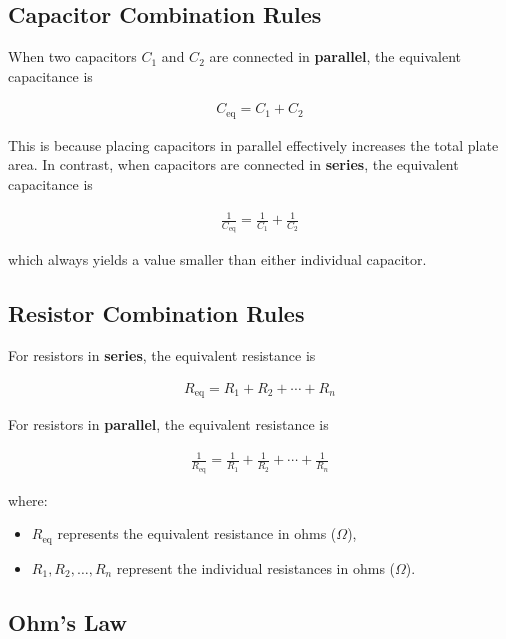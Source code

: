 \message{ !name(lab_report.tex)}\documentclass[12pt]{article}
\begin{document}
\subsection{Capacitor Combination Rules}

When two capacitors $C_1$ and $C_2$ are connected in \textbf{parallel}, the equivalent capacitance is

\begin{align*}
    C_{\text{eq}} = C_1 + C_2
\end{align*}

This is because placing capacitors in parallel effectively increases the total plate area. In contrast, when capacitors are connected in \textbf{series}, the equivalent capacitance is

\begin{align*}
    \frac{1}{C_{\text{eq}}} = \frac{1}{C_1} + \frac{1}{C_2}
\end{align*}

which always yields a value smaller than either individual capacitor.

\subsection{Resistor Combination Rules}

For resistors in \textbf{series}, the equivalent resistance is

\begin{align*}
    R_{\text{eq}} = R_1 + R_2 + \cdots + R_n
\end{align*}

For resistors in \textbf{parallel}, the equivalent resistance is

\begin{align*}
    \frac{1}{R_{\text{eq}}} = \frac{1}{R_1} + \frac{1}{R_2} + \cdots + \frac{1}{R_n}
\end{align*}

where:
\begin{itemize}
    \item $R_{\text{eq}}$ represents the equivalent resistance in ohms ($\Omega$),
    \item $R_1, R_2, \ldots, R_n$ represent the individual resistances in ohms ($\Omega$).
\end{itemize}

\subsection{Ohm's Law}
\end{document}
